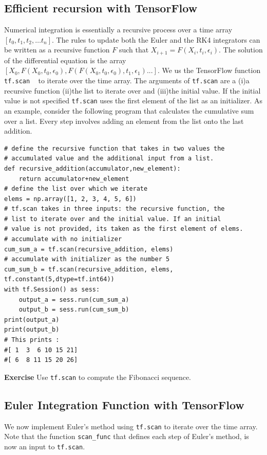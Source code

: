 \documentclass[10pt,letterpaper]{article}
\begin{document}
\subsection*{Efficient recursion with TensorFlow}
Numerical integration is essentially a recursive process over a time array $[t_{0},t_{1},t_{2},\dots t_{n}]$. The rules to update both the Euler and the RK4 integrators can be written as a recursive function $F$ such that $X_{i+1}=F(X_i,t_i,\epsilon_i)$. The solution of the differential equation is the array $[X_0,F(X_0,t_0,\epsilon_0),F(F(X_0,t_0,\epsilon_0),t_1,\epsilon_1)...]$. We us the TensorFlow function \texttt{tf.scan} ~\cite{tensorflow-api-docs} to iterate over the time array. The arguments of \texttt{tf.scan} are a (i)a recursive function (ii)the list to iterate over and (iii)the initial value. If the initial value is not specified \texttt{tf.scan} uses the first element of the list as an initializer. As an example, consider the following program that  calculates the cumulative sum over a list. Every step involves adding an element from the list onto the last addition. 

\begin{verbatim}
# define the recursive function that takes in two values the
# accumulated value and the additional input from a list.
def recursive_addition(accumulator,new_element):
    return accumulator+new_element
# define the list over which we iterate
elems = np.array([1, 2, 3, 4, 5, 6])
# tf.scan takes in three inputs: the recursive function, the 
# list to iterate over and the initial value. If an initial 
# value is not provided, its taken as the first element of elems.
# accumulate with no initializer
cum_sum_a = tf.scan(recursive_addition, elems) 
# accumulate with initializer as the number 5
cum_sum_b = tf.scan(recursive_addition, elems, tf.constant(5,dtype=tf.int64))
with tf.Session() as sess:
    output_a = sess.run(cum_sum_a)
    output_b = sess.run(cum_sum_b)
print(output_a)
print(output_b)
# This prints :
#[ 1  3  6 10 15 21]
#[ 6  8 11 15 20 26]
\end{verbatim}

\textbf{Exercise} Use \texttt{tf.scan} to compute the Fibonacci sequence. 

\subsection*{Euler Integration Function with TensorFlow}
We now implement Euler's method using \texttt{tf.scan} to iterate over the time array. Note that the function \texttt{scan\_func} that defines each step of Euler's method, is now an input to \texttt{tf.scan}.
\end{document}
